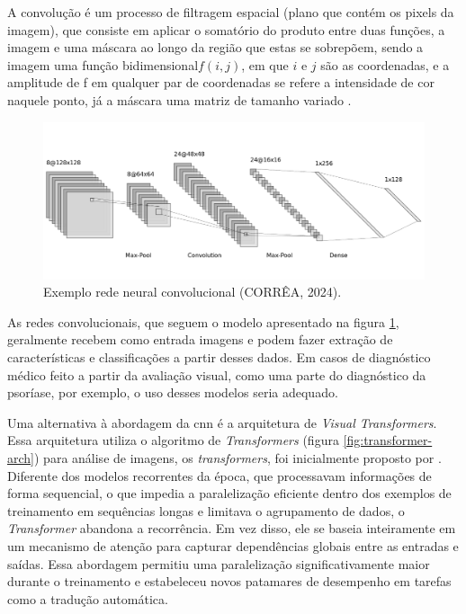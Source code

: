 A convolução é um processo de filtragem espacial (plano que contém os pixels da imagem), que consiste em aplicar o somatório do produto entre duas funções, a imagem e uma máscara ao longo da região que estas se sobrepõem, sendo a imagem uma função bidimensional\( f(i,j)\), em que \(i\) e \(j\) são as coordenadas, e a amplitude de f em qualquer par de coordenadas se refere a intensidade de cor naquele ponto, já a máscara uma matriz de tamanho variado \cite{gonzalez2008digital}. 

\begin{figure}[h]
    \centering
    \includegraphics[scale=0.4]{images/redeconv.png}
    \caption{Exemplo rede neural convolucional (CORRÊA, 2024).}
    \label{fig: cnn}
\end{figure}


As redes convolucionais, que seguem o modelo apresentado na figura \ref{fig: cnn}, geralmente recebem como entrada imagens e podem fazer extração de características e classificações a partir desses dados. Em casos de diagnóstico médico feito a partir da avaliação visual, como uma parte do diagnóstico da psoríase, por exemplo, o uso desses modelos seria adequado.

Uma alternativa à abordagem da \gls{cnn} é a arquitetura de \textit{Visual Transformers}. Essa arquitetura utiliza o algoritmo de \textit{Transformers} (figura \ref{fig:transformer-arch}) para análise de imagens, os \textit{transformers}, foi inicialmente proposto por \citeauthor{Vaswani}. Diferente dos modelos recorrentes da época, que processavam informações de forma sequencial, o que impedia a paralelização eficiente dentro dos exemplos de treinamento em sequências longas e limitava o agrupamento de dados, o \textit{Transformer} abandona a recorrência. Em vez disso, ele se baseia inteiramente em um mecanismo de atenção para capturar dependências globais entre as entradas e saídas. 
Essa abordagem permitiu uma paralelização significativamente maior durante o treinamento e estabeleceu novos patamares de desempenho em tarefas como a tradução automática.

